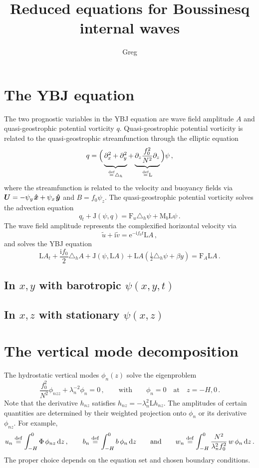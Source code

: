 \documentclass[12pt, oneside]{article}
\newcommand*\mystrut[1]{\vrule width0pt height0pt depth#1\relax}
\newcommand{\com}{\, ,}
\newcommand{\per}{\, .}
\newcommand{\defn}{\ensuremath{\stackrel{\mathrm{def}}{=}}}
\newcommand{\beq}{\begin{equation}}
\newcommand{\eeq}{\end{equation}}
\newcommand{\p}{\partial}
\newcommand{\hlap}{\triangle_h}
\newcommand{\bxh}{\hspace{0.1em} \boldsymbol{\hat x}}
\newcommand{\byh}{\hspace{0.1em}\boldsymbol{\hat y}}
\newcommand{\bU}{\boldsymbol{U}}
\newcommand{\ee}{\mathrm{e}}
\newcommand{\ii}{\mathrm{i}}
\newcommand{\id}{{\, \rm d}}
\newcommand{\J}{\mathrm{J}}
\renewcommand{\L}{\mathrm{L}}
\newcommand{\friction}{\mathrm{F}}
\newcommand{\mixing}{\mathrm{M}}
\newcommand{\mode}{\phi}
\begin{document}
\title{\vspace{-4ex} Reduced equations for Boussinesq internal waves}
\author{Greg}
\date{} \maketitle \vspace{-4ex}

\section{The YBJ equation}

The two prognostic variables in the YBJ equation are wave field amplitude $A$ and quasi-geostrophic potential vorticity $q$. Quasi-geostrophic potential vorticity is related to the quasi-geostrophic streamfunction through the elliptic equation
\beq
q = \Big ( \underbrace{\mystrut{2ex} \p_x^2 + \p_y^2}_{\defn \hlap} + \underbrace{\mystrut{2ex} \p_z \frac{f_0^2}{N^2} \p_z}_{\defn \L} \Big ) \psi \com
\eeq
where the streamfunction is related to the velocity and buoyancy fields via $\bU = - \psi_y \bxh + \psi_x \byh$ and $B = f_0 \psi_z$.  The quasi-geostrophic potential vorticity solves the advection equation
\beq
q_t + \J \left ( \psi, q \right ) = \friction_u \hlap \psi + \mixing_b \L \psi \per
\eeq
The wave field amplitude represents the complexified horizontal velocity via
\beq
\tilde u + \ii \tilde v = \ee^{- \ii f_0 t} \L A \com
\eeq
and solves the YBJ equation
\beq
\L A_t + \frac{\ii f_0}{2} \hlap A +  \J \left ( \psi, \L A \right ) + \L A \left ( \tfrac{\ii}{2} \hlap \psi + \beta y \right ) = \friction_A \L A \per
\eeq

\subsection{In $x,y$ with barotropic $\psi(x, y, t)$}

\subsection{In $x, z$ with stationary $\psi(x, z)$}

\appendix

\section{The vertical mode decomposition}
\label{verticalModeProjection}

The hydrostatic vertical modes $\mode_n(z)$ solve the eigenproblem
\beq
\frac{f_0^2}{N^2} \mode_{nzz} + \lambda_n^{-2} \mode_n = 0 \com \qquad \text{with} \qquad \mode_n = 0 \quad \text{at} \quad z = -H, 0 \per
\label{modalEigenproblem}
\eeq
Note that the derivative $h_{nz}$ satisfies $h_{nz} = - \lambda_n^2 \L h_{nz}$.  The amplitudes of certain quantities are determined by their weighted projection onto $\mode_n$ or its derivative $\mode_{nz}$. For example, 
\beq
u_n \defn \int_{-H}^0 \Phi \, \mode_{nz} \id z \com \qquad b_n \defn \int_{-H}^0 b \, \mode_n \id z  \qquad \text{and} \qquad w_n \defn \int_{-H}^0 \frac{N^2}{\lambda_n^2 f_0^2} \, w \, \mode_n \id z  \per
\label{modezDef}
\eeq
The proper choice depends on the equation set and chosen boundary conditions.
\end{document}
